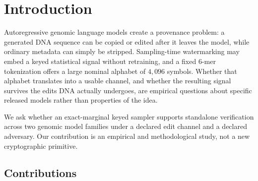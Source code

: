 \section{Introduction}

Autoregressive genomic language models create a provenance problem: a generated DNA sequence can be
copied or edited after it leaves the model, while ordinary metadata can simply be stripped.
Sampling-time watermarking may embed a keyed statistical signal without retraining, and a fixed 6-mer
tokenization offers a large nominal alphabet of $4{,}096$ symbols. Whether that alphabet translates
into a usable channel, and whether the resulting signal survives the edits DNA actually undergoes, are
empirical questions about specific released models rather than properties of the idea.

We ask whether an exact-marginal keyed sampler supports standalone verification across two genomic
model families under a declared edit channel and a declared adversary. Our contribution is an
empirical and methodological study, not a new cryptographic primitive.

\subsection*{Contributions}

